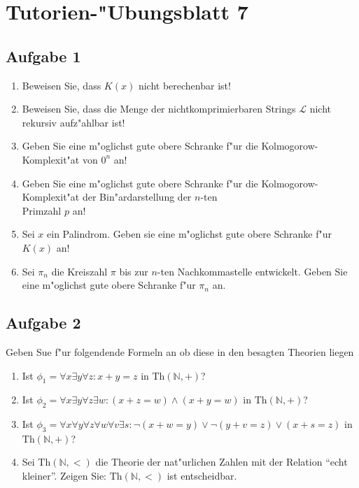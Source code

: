 \documentclass[10pt,oneside,onecolumn,a4paper,german,titlepage]{article}
\begin{document}
\section*{Tutorien-"Ubungsblatt 7}

\subsection*{Aufgabe 1}
\begin{enumerate}
\item Beweisen Sie, dass $K(x)$ nicht berechenbar ist!
\item Beweisen Sie, dass die Menge der nichtkomprimierbaren Strings $\mathcal{L}$
nicht rekursiv aufz"ahlbar ist!
\item Geben Sie eine m"oglichst gute obere Schranke f"ur die Kolmogorow-Komplexit"at von $0^n$ an!
\item Geben Sie eine m"oglichst gute obere Schranke f"ur die Kolmogorow-Komplexit"at der
Bin"ardarstellung der $n$-ten\\ Primzahl $p$ an!
\item Sei $x$ ein Palindrom. Geben sie eine m"oglichst gute obere Schranke f"ur $K(x)$ an!
\item Sei $\pi_n$ die Kreiszahl $\pi$ bis zur $n$-ten Nachkommastelle entwickelt. Geben Sie eine m"oglichst gute obere Schranke f"ur $\pi_n$ an.
\end{enumerate}

\subsection*{Aufgabe 2}
Geben Sue f"ur folgendende Formeln an ob diese in den besagten Theorien liegen
\begin{enumerate}
\item Ist $\phi_1 = \forall x \exists y \forall z: x + y = z$ in $\text{Th}(\mathbb{N,+})$?
\item Ist $\phi_2 = \forall x \exists y \forall z \exists w: (x + z = w ) \wedge (x + y = w)$  in $\text{Th}(\mathbb{N},+)$?
\item Ist $\phi_3 = \forall x \forall y \forall z \forall w \forall v \exists s: \neg(x + w = y) \vee \neg(y + v = z) \vee (x + s = z)$ in $\text{Th}(\mathbb{N},+)$?
\item Sei $\text{Th}(\mathbb{N},<)$ die Theorie der nat"urlichen Zahlen mit der Relation "`echt kleiner"'. Zeigen Sie: $\text{Th}(\mathbb{N},<)$ ist entscheidbar.
\end{enumerate}
\end{document}
